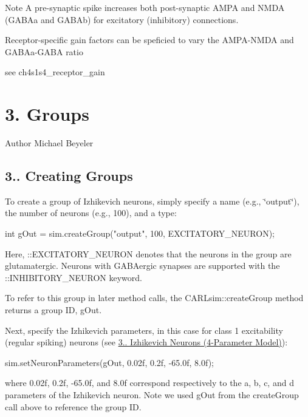 \begin{DoxyNote}{Note}
A pre-\/synaptic spike increases both post-\/synaptic A\+M\+PA and N\+M\+DA (G\+A\+B\+Aa and G\+A\+B\+Ab) for excitatory (inhibitory) connections. 

Receptor-\/specific gain factors can be speficied to vary the A\+M\+P\+A-\/\+N\+M\+DA and G\+A\+B\+Aa-\/\+G\+A\+BA ratio
\end{DoxyNote}
see ch4s1s4\+\_\+receptor\+\_\+gain\hypertarget{ch3_neurons_synapses_groups_ch3s3_groups}{}\section{3. Groups}\label{ch3_neurons_synapses_groups_ch3s3_groups}
\begin{DoxyAuthor}{Author}
Michael Beyeler
\end{DoxyAuthor}
\hypertarget{ch3_neurons_synapses_groups_ch3s3s1_creating_groups}{}\subsection{3.. Creating Groups}\label{ch3_neurons_synapses_groups_ch3s3s1_creating_groups}
To create a group of Izhikevich neurons, simply specify a name (e.\+g., \char`\"{}output\char`\"{}), the number of neurons (e.\+g., 100), and a type\+: 
\begin{DoxyCode}
\textcolor{keywordtype}{int} gOut = sim.createGroup(\textcolor{stringliteral}{"output"}, 100, EXCITATORY\_NEURON);
\end{DoxyCode}
 Here, \+::\+E\+X\+C\+I\+T\+A\+T\+O\+R\+Y\+\_\+\+N\+E\+U\+R\+ON denotes that the neurons in the group are glutamatergic. Neurons with G\+A\+B\+Aergic synapses are supported with the \+::\+I\+N\+H\+I\+B\+I\+T\+O\+R\+Y\+\_\+\+N\+E\+U\+R\+ON keyword.

To refer to this group in later method calls, the C\+A\+R\+Lsim\+::create\+Group method returns a group ID, {\ttfamily g\+Out}.

Next, specify the Izhikevich parameters, in this case for class 1 excitability (regular spiking) neurons (see \hyperlink{ch3_neurons_synapses_groups_ch3s1s1_izhikevich_neurons4}{3.. Izhikevich Neurons (4-\/\+Parameter Model)})\+: 
\begin{DoxyCode}
sim.setNeuronParameters(gOut, 0.02f, 0.2f, -65.0f, 8.0f);
\end{DoxyCode}
 where 0.\+02f, 0.\+2f, -\/65.\+0f, and 8.\+0f correspond respectively to the a, b, c, and d parameters of the Izhikevich neuron. Note we used {\ttfamily g\+Out} from the {\ttfamily create\+Group} call above to reference the group ID.


